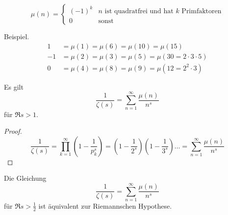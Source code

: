 \begin{frame}

    \begin{definition}
        \[
            \mu(n) = \begin{cases}
                (-1)^k & n \text{ ist quadratfrei und hat $k$ Primfaktoren}\\
                0 & \text{sonst}
            \end{cases}  
        \]
    \end{definition}
    \begin{block}{Beispiel.}
        \begin{align*}
            1 &= \mu(1) = \mu(6) = \mu(10) = \mu(15)\\ 
            -1 &= \mu(2) = \mu(3) = \mu(5) = \mu(30 = 2 \cdot 3 \cdot 5)\\
            0 &= \mu(4) = \mu(8) = \mu(9) = \mu(12 = 2^2 \cdot 3)
        \end{align*}
    \end{block}
\end{frame}
\begin{frame}
    \begin{lemma}
        Es gilt \[
            \frac{1}{\zeta(s)} = \sum_{n = 1}^{\infty} \frac{\mu(n)}{n^s}  
            \] 
        für $\Re s > 1$.
    \end{lemma}
    \begin{proof}
        \[
            \frac{1}{\zeta(s)} = \prod_{k=1}^\infty \left(1 - \frac{1}{p_k^s}\right) = \left(1 - \frac{1}{2^s}\right)\left(1 - \frac{1}{3^s}\right) \dots = \sum_{n = 1}^{\infty} \frac{\mu(n)}{n^s} 
        \]
    \end{proof}
\end{frame}
\begin{frame}
    \begin{theorem}
        Die Gleichung \[
            \frac{1}{\zeta(s)} = \sum_{n = 1}^{\infty} \frac{\mu(n)}{n^s}
        \] für $\Re s > \frac{1}{2}$ ist äquivalent zur Riemannschen Hypothese.
    \end{theorem}
\end{frame}